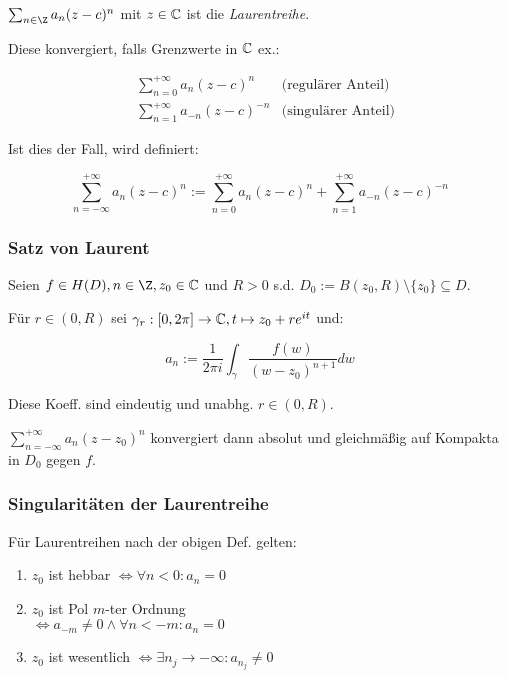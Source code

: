 $\sum_{n \in \Z} a_n (z-c)^n$ mit $z \in \mathbb{C}$ ist die \emph{Laurentreihe}.

Diese konvergiert, falls Grenzwerte in $\mathbb{C}$ ex.:

\vspace*{-4mm}
\begin{align*}
&\sum_{n=0}^{+\infty} a_n(z-c)^n & \text{(regulärer Anteil)} \\
&\sum_{n=1}^{+\infty} a_{-n}(z-c)^{-n} & \text{(singulärer Anteil)}
\end{align*}

Ist dies der Fall, wird definiert:

\vspace*{-4mm}
$$\sum_{n=-\infty}^{+\infty} a_n(z-c)^n := \sum_{n=0}^{+\infty} a_n(z-c)^n + \sum_{n=1}^{+\infty} a_{-n}(z-c)^{-n}$$

\subsubsection*{Satz von Laurent}

Seien $f \in H(D), n \in \Z, z_0 \in \C$ und $R > 0$ s.d. $D_0 := B(z_0,R) \setminus \{z_0\} \subseteq D$.

Für $r \in (0,R)$ sei $\gamma_r : [0,2\pi] \to \mathbb{C}, t \mapsto z_0 + re^{it}$ und:

$$a_n := \frac{1}{2\pi i} \int_\gamma \frac{f(w)}{(w-z_0)^{n+1}} dw$$

Diese Koeff. sind eindeutig und unabhg. $r \in (0,R)$.

\spacing

$\sum_{n=-\infty}^{+\infty} a_n(z-z_0)^n$ konvergiert dann absolut und gleichmäßig auf Kompakta in $D_0$ gegen $f$.

\subsubsection*{Singularitäten der Laurentreihe}

Für Laurentreihen nach der obigen Def. gelten:

\begin{enumerate}[label=(\alph*)]
	\item $z_0$ ist hebbar $\iff \forall n < 0 : a_n = 0$
	\item $z_0$ ist Pol $m$-ter Ordnung \\ $\iff a_{-m} \neq 0 \land \forall n < -m : a_n = 0$
	\item $z_0$ ist wesentlich $\iff \exists n_j \to -\infty : a_{n_j} \neq 0$
\end{enumerate}

